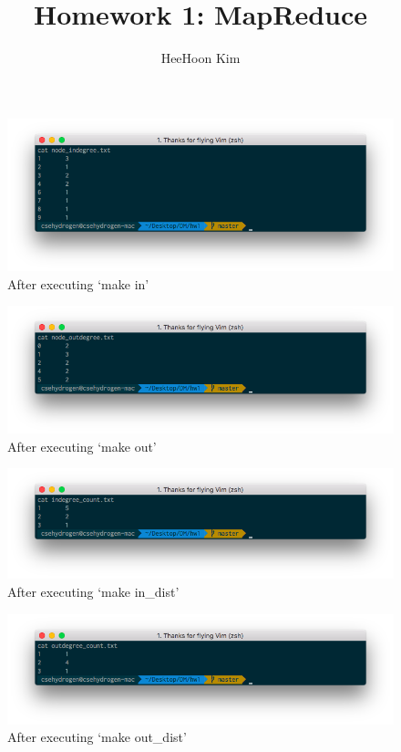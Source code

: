 \documentclass[12pt]{article}
\begin{document}
\title{Homework 1: MapReduce}
\author{HeeHoon Kim}
\maketitle

\begin{figure}[ht]
    \includegraphics[width=\linewidth]{q1}
    \caption{After executing `make in'}
\end{figure}

\begin{figure}[ht]
    \includegraphics[width=\linewidth]{q2}
    \caption{After executing `make out'}
\end{figure}

\begin{figure}[ht]
    \includegraphics[width=\linewidth]{q3_1}
    \caption{After executing `make in\_dist'}
\end{figure}

\begin{figure}[ht]
    \includegraphics[width=\linewidth]{q3_2}
    \caption{After executing `make out\_dist'}
\end{figure}
\end{document}
